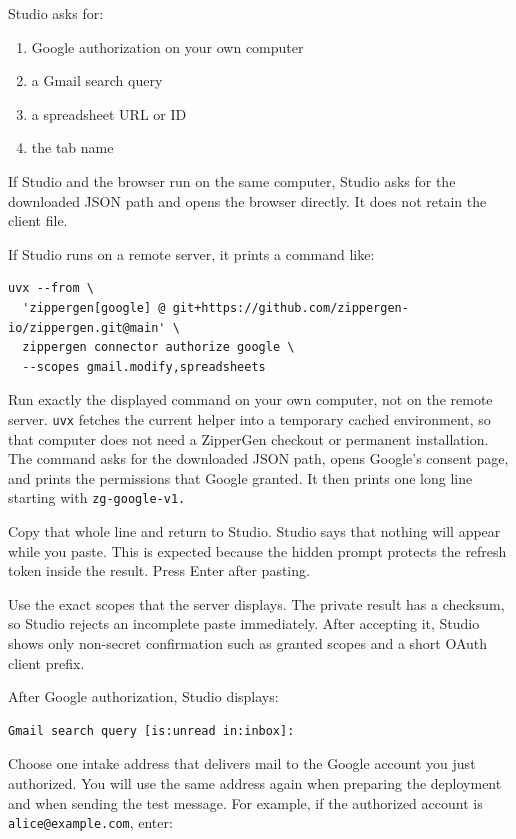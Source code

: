 \documentclass[11pt,a4paper]{article}
\begin{document}
Studio asks for:

\begin{enumerate}
  \item Google authorization on your own computer
  \item a Gmail search query
  \item a spreadsheet URL or ID
  \item the tab name
\end{enumerate}

If Studio and the browser run on the same computer, Studio asks for the
downloaded JSON path and opens the browser directly. It does not retain the
client file.

If Studio runs on a remote server, it prints a command like:

\begin{lstlisting}[style=shell]
uvx --from \
  'zippergen[google] @ git+https://github.com/zippergen-io/zippergen.git@main' \
  zippergen connector authorize google \
  --scopes gmail.modify,spreadsheets
\end{lstlisting}

Run exactly the displayed command on your own computer, not on the remote
server. \texttt{uvx} fetches the current helper into a temporary cached
environment, so that computer does not need a ZipperGen checkout or permanent
installation. The command asks for the downloaded JSON path, opens Google's
consent page, and prints the permissions that Google granted. It then prints
one long line starting with \texttt{zg-google-v1.}

Copy that whole line and return to Studio. Studio says that nothing will
appear while you paste. This is expected because the hidden prompt protects
the refresh token inside the result. Press Enter after pasting.

Use the exact scopes that the server displays. The private result has a
checksum, so Studio rejects an incomplete paste immediately. After accepting
it, Studio shows only non-secret confirmation such as granted scopes and a
short OAuth client prefix.

After Google authorization, Studio displays:

\begin{lstlisting}[style=shell]
Gmail search query [is:unread in:inbox]:
\end{lstlisting}

Choose one intake address that delivers mail to the Google account you just
authorized. You will use the same address again when preparing the deployment
and when sending the test message. For example, if the authorized account is
\texttt{alice@example.com}, enter:
\end{document}
